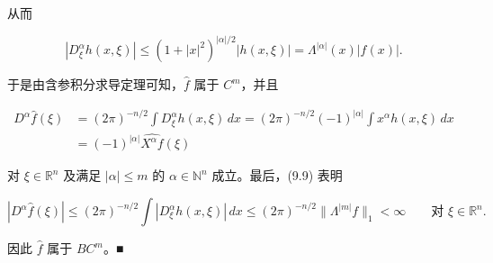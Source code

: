 \begin{proposition}
从而

\begin{equation}
|D_\xi^\alpha h(x,\xi)| \le (1+|x|^2)^{|\alpha|/2}|h(x,\xi)| = \Lambda^{|\alpha|}(x)|f(x)| .\tag{9.9}
\end{equation}

于是由含参积分求导定理可知，$ \widehat{f} $ 属于 $ C^m $，并且

\begin{equation*}
\begin{aligned}
D^\alpha\widehat{f}(\xi) &= (2\pi)^{-n/2}\int D_\xi^\alpha h(x,\xi)\,dx = (2\pi)^{-n/2}(-1)^{|\alpha|}\int x^\alpha h(x,\xi)\,dx \\ &= (-1)^{|\alpha|}\widehat{X^\alpha f}(\xi)
\end{aligned}
\end{equation*}

对 $ \xi \in \mathbb{R}^n $ 及满足 $ |\alpha| \le m $ 的 $ \alpha \in \mathbb{N}^n $ 成立。最后，(9.9) 表明

\[
|D^\alpha\widehat{f}(\xi)| \le (2\pi)^{-n/2}\int|D_\xi^\alpha h(x,\xi)|\,dx \le (2\pi)^{-n/2}\|\Lambda^{|m|}f\|_1 < \infty \qquad \text{对 } \xi \in \mathbb{R}^n .
\]

因此 $ \widehat{f} $ 属于 $ BC^m $。\nobreak\hspace{0.35em}■

\end{proposition}

